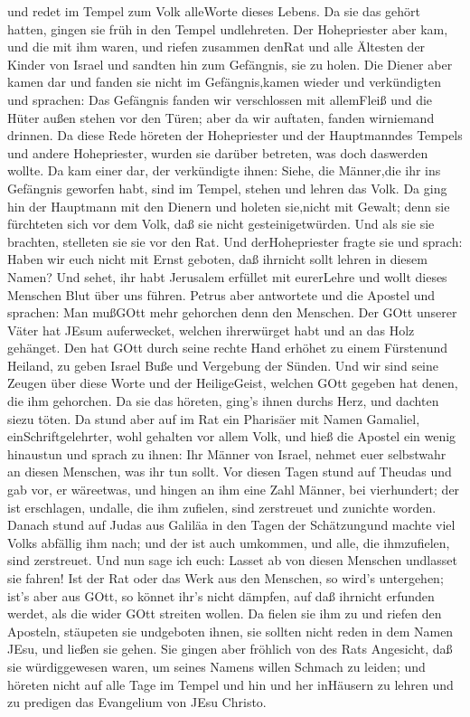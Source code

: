 und redet im Tempel zum Volk alleWorte dieses Lebens.  Da
sie das gehört hatten, gingen sie früh in den Tempel undlehreten. Der
Hohepriester aber kam, und die mit ihm waren, und riefen zusammen denRat
und alle Ältesten der Kinder von Israel und sandten hin zum Gefängnis,
sie zu holen.  Die Diener aber kamen dar und fanden sie
nicht im Gefängnis,kamen wieder und verkündigten  und
sprachen: Das Gefängnis fanden wir verschlossen mit allemFleiß und die
Hüter außen stehen vor den Türen; aber da wir auftaten, fanden
wirniemand drinnen.  Da diese Rede höreten der Hohepriester
und der Hauptmanndes Tempels und andere Hohepriester, wurden sie darüber
betreten, was doch daswerden wollte.  Da kam einer dar, der
verkündigte ihnen: Siehe, die Männer,die ihr ins Gefängnis geworfen
habt, sind im Tempel, stehen und lehren das Volk.  Da ging
hin der Hauptmann mit den Dienern und holeten sie,nicht mit Gewalt; denn
sie fürchteten sich vor dem Volk, daß sie nicht gesteinigetwürden.
 Und als sie sie brachten, stelleten sie sie vor den Rat.
Und derHohepriester fragte sie  und sprach: Haben wir euch
nicht mit Ernst geboten, daß ihrnicht sollt lehren in diesem Namen? Und
sehet, ihr habt Jerusalem erfüllet mit eurerLehre und wollt dieses
Menschen Blut über uns führen.  Petrus aber antwortete und
die Apostel und sprachen: Man mußGOtt mehr gehorchen denn den Menschen.
 Der GOtt unserer Väter hat JEsum auferwecket, welchen
ihrerwürget habt und an das Holz gehänget.  Den hat GOtt
durch seine rechte Hand erhöhet zu einem Fürstenund Heiland, zu geben
Israel Buße und Vergebung der Sünden.  Und wir sind seine
Zeugen über diese Worte und der HeiligeGeist, welchen GOtt gegeben hat
denen, die ihm gehorchen.  Da sie das höreten, ging's ihnen
durchs Herz, und dachten siezu töten.  Da stund aber auf im
Rat ein Pharisäer mit Namen Gamaliel, einSchriftgelehrter, wohl gehalten
vor allem Volk, und hieß die Apostel ein wenig hinaustun 
und sprach zu ihnen: Ihr Männer von Israel, nehmet euer selbstwahr an
diesen Menschen, was ihr tun sollt.  Vor diesen Tagen stund
auf Theudas und gab vor, er wäreetwas, und hingen an ihm eine Zahl
Männer, bei vierhundert; der ist erschlagen, undalle, die ihm zufielen,
sind zerstreuet und zunichte worden.  Danach stund auf
Judas aus Galiläa in den Tagen der Schätzungund machte viel Volks
abfällig ihm nach; und der ist auch umkommen, und alle, die ihmzufielen,
sind zerstreuet.  Und nun sage ich euch: Lasset ab von
diesen Menschen undlasset sie fahren! Ist der Rat oder das Werk aus den
Menschen, so wird's untergehen;  ist's aber aus GOtt, so
könnet ihr's nicht dämpfen, auf daß ihrnicht erfunden werdet, als die
wider GOtt streiten wollen.  Da fielen sie ihm zu und
riefen den Aposteln, stäupeten sie undgeboten ihnen, sie sollten nicht
reden in dem Namen JEsu, und ließen sie gehen.  Sie gingen
aber fröhlich von des Rats Angesicht, daß sie würdiggewesen waren, um
seines Namens willen Schmach zu leiden;  und höreten nicht
auf alle Tage im Tempel und hin und her inHäusern zu lehren und zu
predigen das Evangelium von JEsu Christo.

